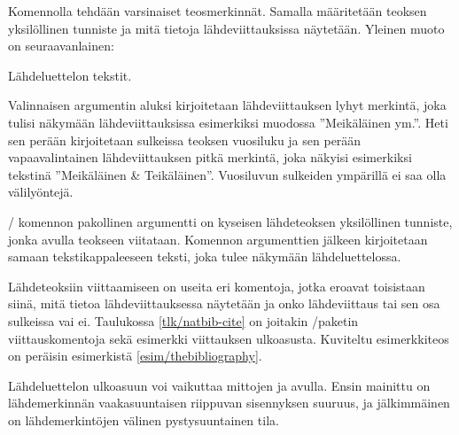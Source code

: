 Komennolla  tehdään varsinaiset teosmerkinnät. Samalla
määritetään teoksen yksilöllinen tunniste ja mitä tietoja
lähdeviittauksissa näytetään. Yleinen muoto on seuraavanlainen:

\begin{koodilohkosis}
 Lähdeluettelon tekstit.
\end{koodilohkosis}

\noindent
Valinnaisen argumentin aluksi kirjoitetaan lähdeviittauksen lyhyt
merkintä, joka tulisi näkymään lähdeviittauksissa esimerkiksi muodossa
''Meikäläinen ym.''. Heti sen perään kirjoitetaan sulkeissa teoksen
vuosiluku ja sen perään vapaavalintainen lähdeviittauksen pitkä
merkintä, joka näkyisi esimerkiksi tekstinä ''Meikäläinen \&
Teikäläinen''. Vuosiluvun sulkeiden ympärillä ei saa olla välilyöntejä.

\-/ komennon pakollinen argumentti on kyseisen
lähdeteoksen yksilöllinen tunniste, jonka avulla teokseen viitataan.
Komennon argumenttien jälkeen kirjoitetaan samaan tekstikappaleeseen
teksti, joka tulee näkymään lähdeluettelossa.

Lähdeteoksiin viittaamiseen on useita eri komentoja, jotka eroavat
toisistaan siinä, mitä tietoa lähdeviittauksessa näytetään ja onko
lähdeviittaus tai sen osa sulkeissa vai ei. Taulukossa
\ref{tlk/natbib-cite} on joitakin \-/paketin
viittauskomentoja sekä esimerkki viittauksen ulkoasusta. Kuviteltu
esimerkkiteos on peräisin esimerkistä \ref{esim/thebibliography}.


Lähdeluettelon ulkoasuun voi vaikuttaa mittojen  ja
 avulla. Ensin mainittu on lähdemerkinnän vaakasuuntaisen
riippuvan sisennyksen suuruus, ja jälkimmäinen on lähdemerkintöjen
välinen pystysuuntainen tila.

